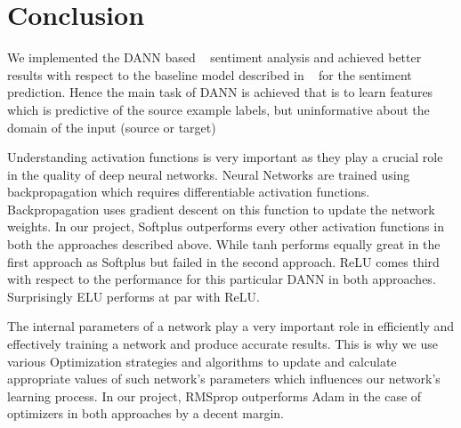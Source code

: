 \documentclass[11pt,a4paper]{article}
\begin{document}
\section{Conclusion}
We implemented the DANN based ~\cite{Ganin:2016} sentiment analysis and achieved better results with respect to the baseline model described in ~\cite{Britz} for the sentiment prediction. Hence the main task of DANN is achieved that is to learn features which is predictive of the source example labels, but uninformative about the domain of the input (source or target)

Understanding activation functions is very important as they play a crucial role in the quality of deep neural networks. Neural Networks are trained using backpropagation which requires differentiable activation functions. Backpropagation uses gradient descent on this function to update the network weights. In our project, Softplus outperforms every other activation functions in both the approaches described above. While tanh performs equally great in the first approach as Softplus but failed in the second approach. ReLU comes third with respect to the performance for this particular DANN in both approaches. Surprisingly ELU performs at par with ReLU.

The internal parameters of a network play a very important role in efficiently and effectively training a network and produce accurate results. This is why we use various Optimization strategies and algorithms to update and calculate appropriate values of such network’s parameters which influences our network’s learning process. In our project, RMSprop outperforms Adam in the case of optimizers in both approaches by a decent margin.
%
%
\end{document}
